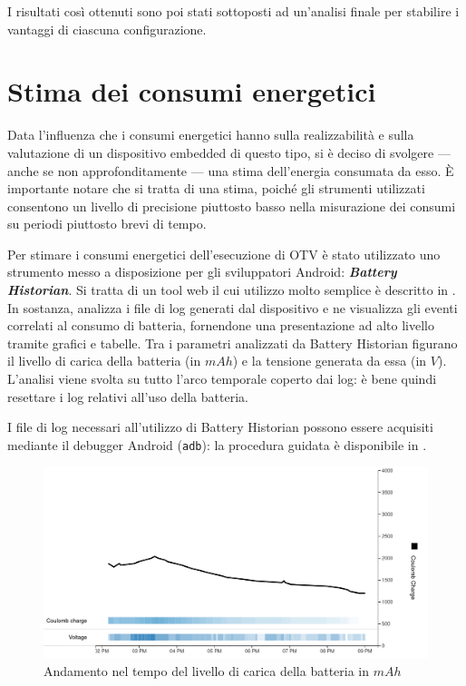\vspace{1em}

I risultati così ottenuti sono poi stati sottoposti ad un'analisi finale per stabilire i vantaggi di ciascuna configurazione. 

\section{Stima dei consumi energetici}

Data l'influenza che i consumi energetici hanno sulla realizzabilità e sulla valutazione di un dispositivo embedded di questo
tipo, si è deciso di svolgere --- anche se non approfonditamente --- una stima dell'energia consumata da esso.
È importante notare che si tratta di una stima, poiché gli strumenti utilizzati consentono un livello di precisione piuttosto
basso nella misurazione dei consumi su periodi piuttosto brevi di tempo.

Per stimare i consumi energetici dell'esecuzione di OTV è stato utilizzato uno strumento messo a disposizione per gli 
sviluppatori Android: \textit{\textbf{Battery Historian}}. Si tratta di un tool web il cui utilizzo molto semplice è 
descritto in \cite{adev_battery}. In sostanza, analizza i file di log generati dal dispositivo e ne visualizza gli eventi
correlati al consumo di batteria, fornendone una presentazione ad alto livello tramite grafici e tabelle.
Tra i parametri analizzati da Battery Historian figurano il livello di carica della batteria (in $mAh$) e la tensione generata
da essa (in $V$). L'analisi viene svolta su tutto l'arco temporale coperto dai log: è bene quindi resettare i log relativi
all'uso della batteria.

I file di log necessari all'utilizzo di Battery Historian possono essere acquisiti mediante il debugger Android (\texttt{adb}): 
la procedura guidata è disponibile in \cite{adev_batlog}.

\begin{figure}[h!]
    \begin{center}
        \includegraphics[scale=0.38]{img/battery_historian_coulomb.png}
        \caption{Andamento nel tempo del livello di carica della batteria in $mAh$}
    \end{center}
\end{figure}

